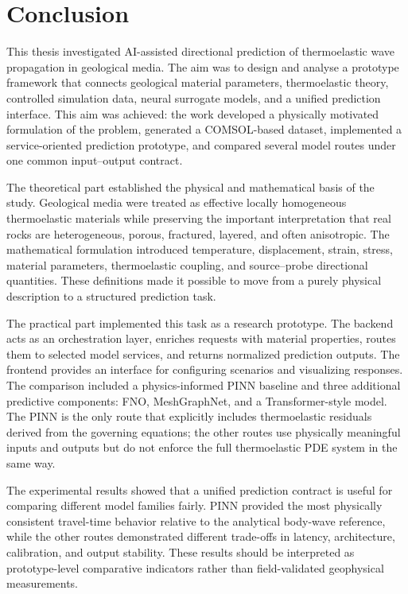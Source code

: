 \section*{Conclusion}

This thesis investigated AI-assisted directional prediction of thermoelastic wave propagation in geological media. The aim was to design and analyse a prototype framework that connects geological material parameters, thermoelastic theory, controlled simulation data, neural surrogate models, and a unified prediction interface. This aim was achieved: the work developed a physically motivated formulation of the problem, generated a COMSOL-based dataset, implemented a service-oriented prediction prototype, and compared several model routes under one common input--output contract.

The theoretical part established the physical and mathematical basis of the study. Geological media were treated as effective locally homogeneous thermoelastic materials while preserving the important interpretation that real rocks are heterogeneous, porous, fractured, layered, and often anisotropic. The mathematical formulation introduced temperature, displacement, strain, stress, material parameters, thermoelastic coupling, and source--probe directional quantities. These definitions made it possible to move from a purely physical description to a structured prediction task.

The practical part implemented this task as a research prototype. The backend acts as an orchestration layer, enriches requests with material properties, routes them to selected model services, and returns normalized prediction outputs. The frontend provides an interface for configuring scenarios and visualizing responses. The comparison included a physics-informed PINN baseline and three additional predictive components: FNO, MeshGraphNet, and a Transformer-style model. The PINN is the only route that explicitly includes thermoelastic residuals derived from the governing equations; the other routes use physically meaningful inputs and outputs but do not enforce the full thermoelastic PDE system in the same way.

The experimental results showed that a unified prediction contract is useful for comparing different model families fairly. PINN provided the most physically consistent travel-time behavior relative to the analytical body-wave reference, while the other routes demonstrated different trade-offs in latency, architecture, calibration, and output stability. These results should be interpreted as prototype-level comparative indicators rather than field-validated geophysical measurements.

